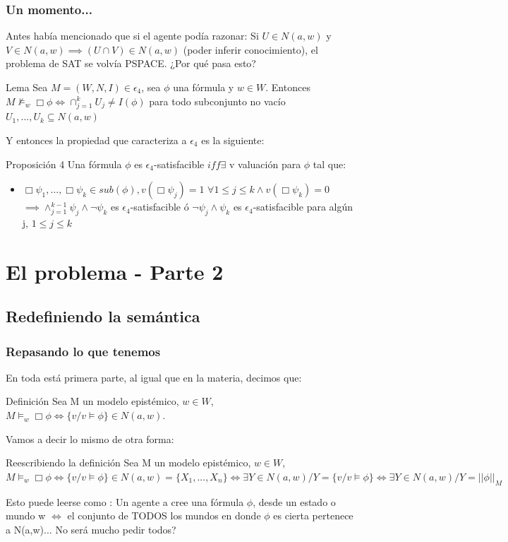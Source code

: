\documentclass{beamer}
\begin{document}
\begin{frame}
\frametitle{Un momento...}

Antes hab\'ia mencionado que si el agente pod\'ia razonar:
Si $U \in N(a,w)$ y $V \in N(a,w) \implies (U \cap V) \in N(a,w)$ (poder inferir conocimiento), el problema de SAT se volv\'ia PSPACE.
¿Por qu\'e pasa esto?

\begin{block}{Lema}
Sea $M = (W,N,I) \in \epsilon_{4}$, sea $\phi$ una f\'ormula y $w \in W$. Entonces $M \nvDash_{w}\Box\phi \iff \cap_{j = 1}^{k} U_{j} \neq I(\phi)$ para todo subconjunto no vac\'io ${U_{1},...,U_{k}} \subseteq N(a,w)$  
\end{block}

Y entonces la propiedad que caracteriza a $\epsilon_{4}$ es la siguiente:

\begin{block}{Proposici\'on 4}
Una f\'ormula $\phi$ es $\epsilon_{4}$-satisfacible $iff \exists$ v valuaci\'on para $\phi$ tal que: 
\begin{itemize}
\item $\Box\psi_{1}, ..., \Box\psi_{k} \in sub(\phi), v(\Box \psi_{j}) = 1$ $\forall 1 \leq j \le k \land v(\Box\psi_{k}) = 0$ $\implies \land_{j = 1}^{k-1} \psi_{j} \land \neg\psi_{k}$ es $\epsilon_{4}$-satisfacible \'o $\neg\psi_{j}\land\psi_{k}$ es $\epsilon_{4}$-satisfacible para alg\'un j, $1 \leq j \le k$
\end{itemize}
\end{block}
\end{frame}

\section{El problema - Parte 2}

\subsection{Redefiniendo la sem\'antica}
\begin{frame}
\frametitle{Repasando lo que tenemos}

En toda est\'a primera parte, al igual que en la materia, decimos que:

\begin{block}{Definici\'on}
 Sea M un modelo epist\'emico, $w \in W$, $M\models_{w} \Box\phi \iff \{v / v\models \phi\} \in N(a,w)$. 
\end{block}
Vamos a decir lo mismo de otra forma:

\begin{block}{Reescribiendo la definici\'on}
 Sea M un modelo epist\'emico, $w \in W$, $M\models_{w} \Box\phi \iff \{v / v\models \phi\} \in N(a,w)=\{X_{1}, ...,X_{n}\} \iff \exists Y \in N(a,w) / Y = \{v / v\models \phi\} \iff \exists Y \in N(a,w) / Y = ||\phi||_{M}$
\end{block}

Esto puede leerse como : Un agente a cree una f\'ormula $\phi$, desde un estado o mundo w $\iff$ el conjunto de TODOS los mundos en donde $\phi$ es cierta pertenece a N(a,w)... No ser\'a mucho pedir todos?

\end{frame}
\end{document}
